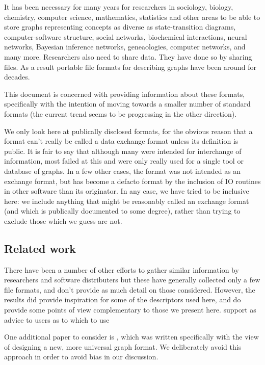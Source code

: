 \documentclass{sig-alternate}
\begin{document}
It has been necessary for many years for researchers in sociology,
biology, chemistry, computer science, mathematics, statistics and
other areas to be able to store graphs representing concepts as
diverse as state-transition diagrams, computer-software structure,
social networks, biochemical interactions, neural networks, Bayesian
inference networks, geneaologies, computer networks, and many more.
Researchers also need to share data. They have done so by sharing
files. As a result portable file formats for describing graphs have
been around for decades.

This document is concerned with providing information about these
formats, specifically with the intention of moving towards a smaller
number of standard formats (the current trend seems to be progressing
in the other direction).

We only look here at publically disclosed formats, for the obvious
reason that a format can't really be called a data exchange format
unless its definition is public. It is fair to say that although many
were intended for interchange of information, most failed at this and
were only really used for a single tool or database of graphs. In a
few other cases, the format was not intended as an exchange format,
but has become a defacto format by the inclusion of IO routines in
other software than its originator. In any case, we have tried to be
inclusive here: we include anything that might be reasonably called an
exchange format (and which is publically documented to some degree),
rather than trying to exclude those which we guess are not.

\subsection{Related work}

There have been a number of other efforts to gather similar
information by researchers
\cite{bodlaj13:_networ,bernard:_graph_file_format,10:_netwik} and
software distributers \cite{yfiles_io,gephi} but these have generally
collected only a few file formats, and don't provide as much detail on
those considered. However, the results did provide inspiration for
some of the descriptors used here, and do provide some points of view
complementary to those we present here. 
support as advice to users as to which to use 

One additional paper to consider is
\cite{brandes00:_graph_data_format_works_repor}, which was written
specifically with the view of designing a new, more universal graph
format. We deliberately avoid this approach in order to avoid bias in
our discussion.
\end{document}
